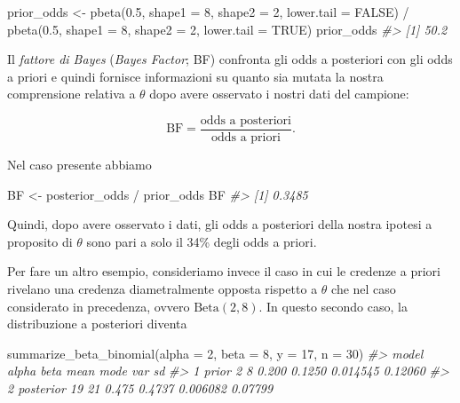 \documentclass[
  11pt,
]{krantz}
\makeatletter
\newenvironment{Shaded}{\begin{snugshade}}{\end{snugshade}}
\newcommand{\AttributeTok}[1]{\textcolor[rgb]{0.61,0.61,0.61}{#1}}
\newcommand{\CommentTok}[1]{\textcolor[rgb]{0.37,0.37,0.37}{\textit{#1}}}
\newcommand{\ConstantTok}[1]{\textcolor[rgb]{0,0,0}{#1}}
\newcommand{\DecValTok}[1]{\textcolor[rgb]{0.06,0.06,0.06}{#1}}
\newcommand{\FloatTok}[1]{\textcolor[rgb]{0.06,0.06,0.06}{#1}}
\newcommand{\FunctionTok}[1]{\textcolor[rgb]{0,0,0}{#1}}
\newcommand{\NormalTok}[1]{#1}
\newcommand{\OtherTok}[1]{\textcolor[rgb]{0.37,0.37,0.37}{#1}}
\newcommand{\SpecialCharTok}[1]{\textcolor[rgb]{0,0,0}{#1}}
\newenvironment{kframe}{%
\medskip{}
\setlength{\fboxsep}{.8em}
 \def\at@end@of@kframe{}%
 \ifinner\ifhmode%
  \def\at@end@of@kframe{\end{minipage}}%
  \begin{minipage}{\columnwidth}%
 \fi\fi%
 \def\FrameCommand##1{\hskip\@totalleftmargin \hskip-\fboxsep
 \colorbox{shadecolor}{##1}\hskip-\fboxsep
     \hskip-\linewidth \hskip-\@totalleftmargin \hskip\columnwidth}%
 \MakeFramed {\advance\hsize-\width
   \@totalleftmargin\z@ \linewidth\hsize
   \@setminipage}}%
 {\par\unskip\endMakeFramed%
 \at@end@of@kframe}
\renewenvironment{Shaded}{\begin{kframe}}{\end{kframe}}
\theoremstyle{definition}
\theoremstyle{definition}
\theoremstyle{definition}
\theoremstyle{definition}
\theoremstyle{remark}
\makeatother
\begin{document}
\begin{Shaded}
\begin{Highlighting}[]
\NormalTok{prior\_odds }\OtherTok{\textless{}{-}}
  \FunctionTok{pbeta}\NormalTok{(}\FloatTok{0.5}\NormalTok{, }\AttributeTok{shape1 =} \DecValTok{8}\NormalTok{, }\AttributeTok{shape2 =} \DecValTok{2}\NormalTok{, }\AttributeTok{lower.tail =} \ConstantTok{FALSE}\NormalTok{) }\SpecialCharTok{/}
    \FunctionTok{pbeta}\NormalTok{(}\FloatTok{0.5}\NormalTok{, }\AttributeTok{shape1 =} \DecValTok{8}\NormalTok{, }\AttributeTok{shape2 =} \DecValTok{2}\NormalTok{, }\AttributeTok{lower.tail =} \ConstantTok{TRUE}\NormalTok{)}
\NormalTok{prior\_odds}
\CommentTok{\#\textgreater{} [1] 50.2}
\end{Highlighting}
\end{Shaded}

Il \emph{fattore di Bayes} (\emph{Bayes Factor}; BF) confronta gli odds a posteriori con gli odds a priori e quindi fornisce informazioni su quanto sia mutata la nostra comprensione relativa a \(\theta\) dopo avere osservato i nostri dati del campione:

\[
\text{BF} = \frac{\text{odds a posteriori}}{\text{odds a priori}}.
\]

Nel caso presente abbiamo

\begin{Shaded}
\begin{Highlighting}[]
\NormalTok{BF }\OtherTok{\textless{}{-}}\NormalTok{ posterior\_odds }\SpecialCharTok{/}\NormalTok{ prior\_odds}
\NormalTok{BF}
\CommentTok{\#\textgreater{} [1] 0.3485}
\end{Highlighting}
\end{Shaded}

Quindi, dopo avere osservato i dati, gli odds a posteriori della nostra ipotesi a proposito di \(\theta\) sono pari a solo il 34\% degli odds a priori.

Per fare un altro esempio, consideriamo invece il caso in cui le credenze a priori rivelano una credenza diametralmente opposta rispetto a \(\theta\) che nel caso considerato in precedenza, ovvero \(\mbox{Beta}(2, 8)\). In questo secondo caso, la distribuzione a posteriori diventa

\begin{Shaded}
\begin{Highlighting}[]
\FunctionTok{summarize\_beta\_binomial}\NormalTok{(}\AttributeTok{alpha =} \DecValTok{2}\NormalTok{, }\AttributeTok{beta =} \DecValTok{8}\NormalTok{, }\AttributeTok{y =} \DecValTok{17}\NormalTok{, }\AttributeTok{n =} \DecValTok{30}\NormalTok{)}
\CommentTok{\#\textgreater{}       model alpha beta  mean   mode      var      sd}
\CommentTok{\#\textgreater{} 1     prior     2    8 0.200 0.1250 0.014545 0.12060}
\CommentTok{\#\textgreater{} 2 posterior    19   21 0.475 0.4737 0.006082 0.07799}
\end{Highlighting}
\end{Shaded}
\end{document}
